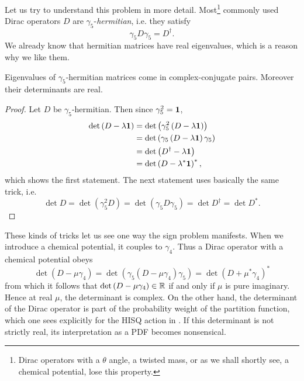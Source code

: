 Let us try to understand this problem in more detail.
Most\footnote{Dirac operators with a $\theta$ angle, a twisted mass,
or as we shall shortly see, a chemical potential, lose this property.} 
commonly used Dirac operators $D$ are
$\gamma_5$-{\it hermitian}, i.e. they satisfy
\begin{equation}
\gamma_5 D\gamma_5=D^\dagger.
\end{equation}
We already know that hermitian matrices have real eigenvalues, which
is a reason why we like them. 
\begin{proposition}{}{}
Eigenvalues of $\gamma_5$-hermitian matrices come in complex-conjugate pairs.
Moreover their determinants are real.
\begin{proof}
Let $D$ be $\gamma_5$-hermitian. Then since $\gamma_5^2={\mathbf 1}$,
\begin{equation*}\begin{aligned}
\det\left(D-\lambda{\mathbf 1}\right)
&=\det\left(\gamma_5^2\left(D-\lambda{\mathbf 1}\right)\right)\\
&=\det\left(\gamma_5\left(D-\lambda{\mathbf 1}\right)\gamma_5\right)\\
&=\det\left(D^\dagger-\lambda{\mathbf 1}\right)\\
&=\det\left(D-\lambda^*{\mathbf 1}\right)^*,\\
\end{aligned}\end{equation*}
which shows the first statement. The next statement uses basically
the same trick, i.e.
$$
\det D 
= \det\left(\gamma_5^2 D\right) 
= \det\left(\gamma_5 D\gamma_5\right) 
= \det D^\dagger
= \det D^*.
$$
\end{proof}
\end{proposition}

These kinds of tricks let us see one way the sign problem manifests.
When we introduce a chemical potential, it couples to $\gamma_4$.
Thus a Dirac operator with a chemical potential obeys
\begin{equation}\label{eq:signproblem}
\det\left(D-\mu\gamma_4\right)
=\det\left(\gamma_5\left(D-\mu\gamma_4\right)\gamma_5\right)
=\det\left(D+\mu^*\gamma_4\right)^*
\end{equation}
from which it follows that
$\det\left(D-\mu\gamma_4\right)\in\mathbb{R}$ if and only if $\mu$
is pure imaginary. Hence at real $\mu$, the determinant
is complex. On the other hand, the determinant of the
Dirac operator is part of the probability weight
of the partition function, which one sees explicitly for
the HISQ action in . If this
determinant is not strictly real, its interpretation
as a PDF becomes nonsensical.

